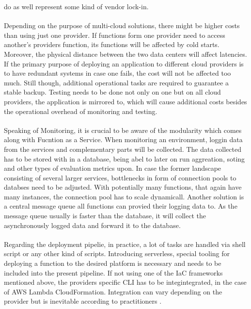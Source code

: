 \documentclass[11pt]{article}
\begin{document}
do as well represent some kind of vendor lock-in.\\\\ Depending on the purpose of multi-cloud solutions, there might be higher costs than using just one provider. If functions form one provider need to access another's providers function, its functions will be affected by cold starts. Moreover, the physical distance between the two data centers will affect latencies. If the primary purpose of deploying an application to different cloud providers is to have redundant systems in case one fails, the cost will not be affected too much. Still though, additional operational tasks are required to guarantee a stable backup. Testing needs to be done not only on one but on all cloud providers, the application is mirrored to, which will cause additional costs besides the operational overhead of monitoring and testing.\\\\ Speaking of Monitoring, it is crucial to be aware of the modularity which comes along with Fucntion as a Service. When monitoring an environment, loggin data from the services and complementary parts will be collected. The data collected has to be stored with in a database, being abel to later on run aggreation, soting and other types of evaluation metrics upon. In case the former landscape consisting of several larger services, bottlenecks in form of connection pools to databses need to be adjusted. With potentially many functions, that again have many instances, the connection pool has to scale dynamicall. Another solution is a central message queue all functions can provied their logging data to. As the message queue usually is faster than the database, it will collect the asynchronously logged data and forward it to the database.\\\\ Regarding the deployment pipelie, in practice, a lot of tasks are handled via shell script or any other kind of scripts. Introducing serverless, special tooling for deploying a function to the desired platform is necessary and needs to be included into the present pipeline. If not using one of the IaC frameworks mentioned above, the providers specific CLI has to be integintegrated, in the case of AWS Lambda CloudFormation. Integration can vary depending on the provider but is inevitable according to practitioners \cite{ivanov2018implementation}.\\\\   
\end{document}

